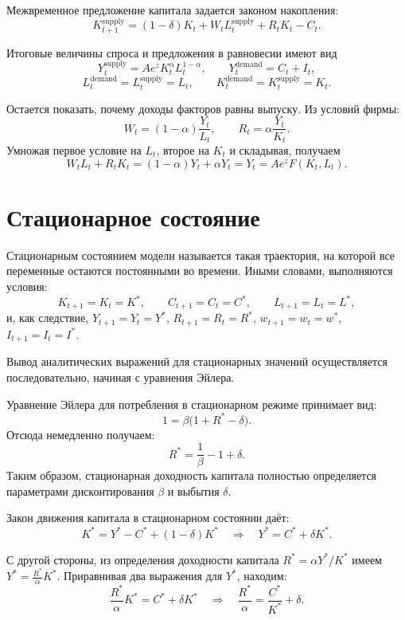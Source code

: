 Межвременное предложение капитала задается законом накопления:
\[
    K_{t+1}^{\mathrm{supply}}
    =
    (1-\delta)K_t
    +
    W_t L_t^{\mathrm{supply}}
    +
    R_tK_t
    -
    C_t.
\]

Итоговые величины спроса и предложения в равновесии имеют вид
\[
    Y_t^{\mathrm{supply}}
    =
    A e^z K_t^\alpha L_t^{1-\alpha},
    \qquad
    Y_t^{\mathrm{demand}}
    =
    C_t+I_t,
\]
\[
    L_t^{\mathrm{demand}}
    =
    L_t^{\mathrm{supply}}
    =
    L_t,
    \qquad
    K_t^{\mathrm{demand}}
    =
    K_t^{\mathrm{supply}}
    =
    K_t.
\]

Остается показать, почему доходы факторов равны выпуску. Из условий фирмы:
\[
    W_t=(1-\alpha)\frac{Y_t}{L_t},
    \qquad
    R_t=\alpha\frac{Y_t}{K_t}.
\]
Умножая первое условие на $L_t$, второе на $K_t$ и складывая, получаем
\[
    W_tL_t+R_tK_t
    =
    (1-\alpha)Y_t+\alpha Y_t
    =
    Y_t
    =
    A e^z F(K_t,L_t).
\]


\section{Стационарное состояние}

  Стационарным состоянием модели называется такая траектория, на которой все переменные остаются постоянными во времени. Иными словами, выполняются условия:
  \[
  K_{t+1}=K_t=K^*, \qquad 
  C_{t+1}=C_t=C^*, \qquad 
  L_{t+1}=L_t=L^*,
  \]
  и, как следствие, $Y_{t+1}=Y_t=Y^*$, $R_{t+1}=R_t=R^*$, $w_{t+1}=w_t=w^*$, $I_{t+1}=I_t=I^*$.

  Вывод аналитических выражений для стационарных значений осуществляется последовательно, начиная с уравнения Эйлера.


  Уравнение Эйлера для потребления в стационарном режиме принимает вид:
  \begin{equation}
  1 = \beta \bigl(1 + R^* - \delta\bigr).
  \end{equation}
  Отсюда немедленно получаем:
  \begin{equation}
  R^* = \frac{1}{\beta} - 1 + \delta. \tag{3.1}
  \end{equation}
  Таким образом, стационарная доходность капитала полностью определяется параметрами дисконтирования $\beta$ и выбытия $\delta$.


  Закон движения капитала в стационарном состоянии даёт:
  \[
  K^* = Y^* - C^* + (1-\delta)K^* \quad\Longrightarrow\quad Y^* = C^* + \delta K^*.
  \]

  С другой стороны, из определения доходности капитала $R^* = \alpha Y^*/K^*$ имеем $Y^* = \frac{R^*}{\alpha}K^*$. Приравнивая два выражения для $Y^*$, находим:
  \[
  \frac{R^*}{\alpha}K^* = C^* + \delta K^* \quad\Longrightarrow\quad 
  \frac{R^*}{\alpha} = \frac{C^*}{K^*} + \delta.
  \]

